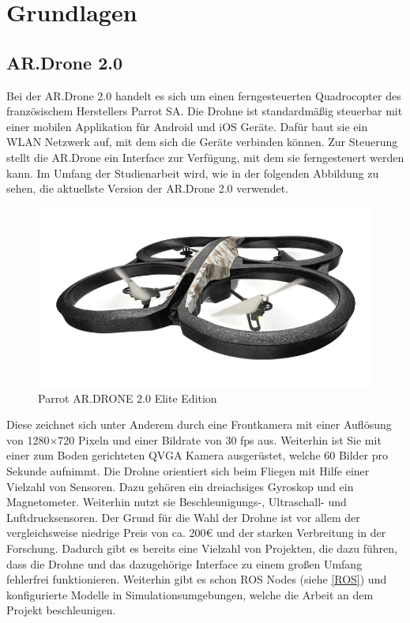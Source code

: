 \chapter{Grundlagen}
\label{cha:Fundamentals}

\section{AR.Drone 2.0}
Bei der AR.Drone 2.0 handelt es sich um einen ferngesteuerten Quadrocopter des französischem Herstellers Parrot SA. \cite{drone} Die Drohne ist standardmäßig steuerbar mit einer mobilen Applikation für Android und iOS Geräte. Dafür baut sie ein WLAN Netzwerk auf, mit dem sich die Geräte verbinden können. Zur Steuerung stellt die AR.Drone ein Interface zur Verfügung, mit dem sie ferngesteuert werden kann. \newline
Im Umfang der Studienarbeit wird, wie in der folgenden Abbildung zu sehen, die aktuellste Version der AR.Drone 2.0 verwendet. \newline
\begin{figure}[ht]
	\centering
	\includegraphics[scale=0.5]{Bilder/ar_drone.png}
	\caption{Parrot AR.DRONE 2.0 Elite Edition \cite{dronepicture}}
	\label{fig:ardrone}
\end{figure}

Diese zeichnet sich unter Anderem durch eine Frontkamera mit einer Auflösung von 1280×720 Pixeln und einer Bildrate von 30 fps aus. Weiterhin ist Sie mit einer zum Boden gerichteten QVGA Kamera ausgerüstet, welche 60 Bilder pro Sekunde aufnimmt. \newline
Die Drohne orientiert sich beim Fliegen mit Hilfe einer Vielzahl von Sensoren. Dazu gehören ein dreiachsiges Gyroskop und ein Magnetometer. Weiterhin nutzt sie Beschleunigungs-, Ultraschall- und Luftdrucksensoren. \newline
Der Grund für die Wahl der Drohne ist vor allem der vergleichsweise niedrige Preis von ca. 200€ und der starken Verbreitung in der Forschung. Dadurch gibt es bereits eine Vielzahl von Projekten, die dazu führen, dass die Drohne und das dazugehörige Interface zu einem großen Umfang fehlerfrei funktionieren. \newline
Weiterhin gibt es schon ROS Nodes (siehe \ref{ROS}) und konfigurierte Modelle in Simulationsumgebungen, welche die Arbeit an dem Projekt beschleunigen.


